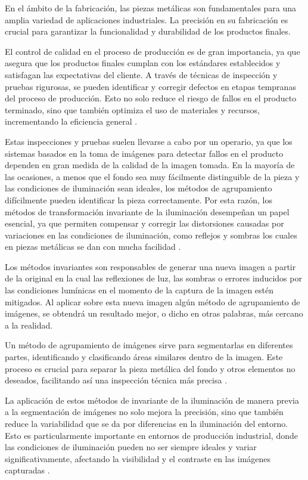 
En el ámbito de la fabricación, las piezas metálicas son fundamentales para una amplia variedad de aplicaciones industriales. La precisión en su fabricación es crucial para garantizar la funcionalidad y durabilidad de los productos finales. 

El control de calidad en el proceso de producción es de gran importancia, ya que asegura que los productos finales cumplan con los estándares establecidos y satisfagan las expectativas del cliente. A través de técnicas de inspección y pruebas rigurosas, se pueden identificar y corregir defectos en etapas tempranas del proceso de producción. Esto no solo reduce el riesgo de fallos en el producto terminado, sino que también optimiza el uso de materiales y recursos, incrementando la eficiencia general \cite{jmmp6060141}.

Estas inspecciones y pruebas suelen llevarse a cabo por un operario, ya que los sistemas basados en la toma de imágenes para detectar fallos en el producto dependen en gran medida de la calidad de la imagen tomada. En la mayoría de las ocasiones, a menos que el fondo sea muy fácilmente distinguible de la pieza y las condiciones de iluminación sean ideales, los métodos de agrupamiento difícilmente pueden identificar la pieza correctamente. Por esta razón, los métodos de transformación invariante de la iluminación desempeñan un papel esencial, ya que permiten compensar y corregir las distorsiones causadas por variaciones en las condiciones de iluminación, como reflejos y sombras los cuales en piezas metálicas se dan con mucha facilidad \cite{vafadar2021}\cite{jmmp6060141}. 

Los métodos invariantes son responsables de generar una nueva imagen a partir de la original en la cual las reflexiones de luz, las sombras o errores inducidos por las condiciones lumínicas en el momento de la captura de la imagen estén mitigados. Al aplicar sobre esta nueva imagen algún método de agrupamiento de imágenes, se obtendrá un resultado mejor, o dicho en otras palabras, más cercano a la realidad.

Un método de agrupamiento de imágenes sirve para segmentarlas en diferentes partes, identificando y clasificando áreas similares dentro de la imagen. Este proceso es crucial para separar la pieza metálica del fondo y otros elementos no deseados, facilitando así una inspección técnica más precisa \cite{bento2019non}.

La aplicación de estos métodos de invariante de la iluminación de manera previa a la segmentación de imágenes no solo mejora la precisión, sino que también reduce la variabilidad que se da por diferencias en la iluminación del entorno. Esto es particularmente importante en entornos de producción industrial, donde las condiciones de iluminación pueden no ser siempre ideales y variar significativamente, afectando la visibilidad y el contraste en las imágenes capturadas \cite{karunakaran2012rapid}.

